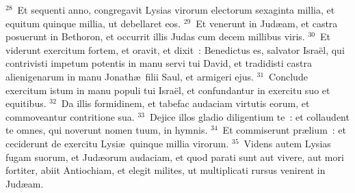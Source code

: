 ${}^{28}$~Et sequenti anno, congregavit Lysias virorum electorum sexaginta millia, et equitum quinque millia, ut debellaret eos.
${}^{29}$~Et venerunt in Jud\ae am, et castra posuerunt in Bethoron, et occurrit illis Judas cum decem millibus viris.
${}^{30}$~Et viderunt exercitum fortem, et oravit, et dixit~: Benedictus es, salvator Isra\"el, qui contrivisti impetum potentis in manu servi tui David, et tradidisti castra alienigenarum in manu Jonath\ae\ filii Saul, et armigeri ejus.
${}^{31}$~Conclude exercitum istum in manu populi tui Isra\"el, et confundantur in exercitu suo et equitibus.
${}^{32}$~Da illis formidinem, et tabefac audaciam virtutis eorum, et commoveantur contritione sua.
${}^{33}$~Dejice illos gladio diligentium te~: et collaudent te omnes, qui noverunt nomen tuum, in hymnis.
${}^{34}$~Et commiserunt pr\ae lium~: et ceciderunt de exercitu Lysi\ae\ quinque millia virorum.
${}^{35}$~Videns autem Lysias fugam suorum, et Jud\ae orum audaciam, et quod parati sunt aut vivere, aut mori fortiter, abiit Antiochiam, et elegit milites, ut multiplicati rursus venirent in Jud\ae am.


